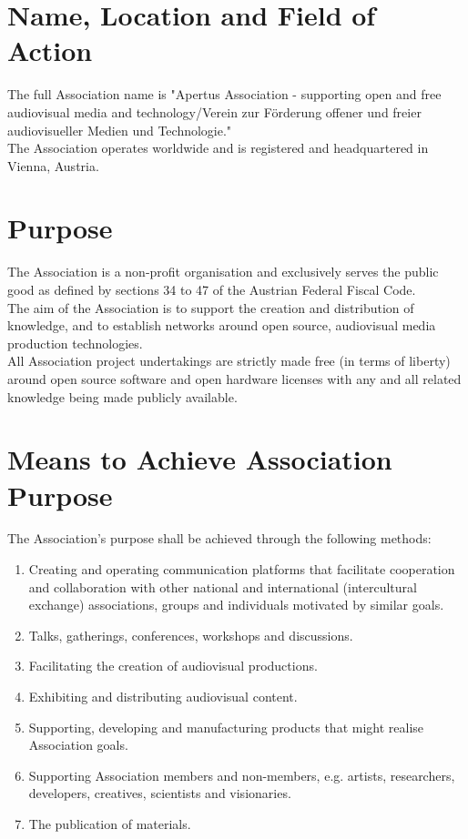 
\section{Name, Location and Field of Action}

The full Association name is "Apertus Association - supporting open and free audiovisual media and technology/Verein zur Förderung offener und freier audiovisueller Medien und Technologie."\\

\noindent The Association operates worldwide and is registered and headquartered in Vienna, Austria.\\




\section{Purpose}

The Association is a non-profit organisation and exclusively serves the public good as defined by sections 34 to 47 of the Austrian Federal Fiscal Code.\\

The aim of the Association is to support the creation and distribution of knowledge, and to establish networks around open source, audiovisual media production technologies.\\

All Association project undertakings are strictly made free (in terms of liberty) around open source software and open hardware licenses with any and all related knowledge being made publicly available.\\




\section{Means to Achieve Association Purpose}

The Association’s purpose shall be achieved through the following methods:

\begin{enumerate}
\item Creating and operating communication platforms that facilitate cooperation and collaboration with 
other national and international (intercultural exchange) associations, groups and individuals motivated by similar goals.
\item Talks, gatherings, conferences, workshops and discussions.
\item Facilitating the creation of audiovisual productions. 
\item Exhibiting and distributing audiovisual content.
\item Supporting, developing and manufacturing products that might realise Association goals.
\item Supporting Association members and non-members, e.g. artists, researchers, developers, creatives, scientists and visionaries.
\item The publication of materials.
\end{enumerate}

